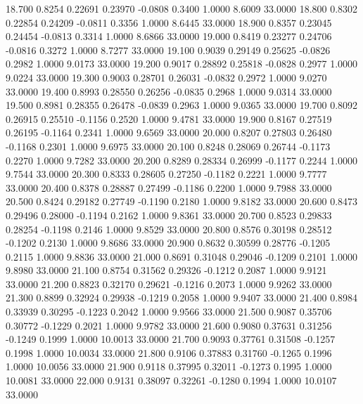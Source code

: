   18.700   0.8254   0.22691   0.23970  -0.0808   0.3400   1.0000   8.6009  33.0000
  18.800   0.8302   0.22854   0.24209  -0.0811   0.3356   1.0000   8.6445  33.0000
  18.900   0.8357   0.23045   0.24454  -0.0813   0.3314   1.0000   8.6866  33.0000
  19.000   0.8419   0.23277   0.24706  -0.0816   0.3272   1.0000   8.7277  33.0000
  19.100   0.9039   0.29149   0.25625  -0.0826   0.2982   1.0000   9.0173  33.0000
  19.200   0.9017   0.28892   0.25818  -0.0828   0.2977   1.0000   9.0224  33.0000
  19.300   0.9003   0.28701   0.26031  -0.0832   0.2972   1.0000   9.0270  33.0000
  19.400   0.8993   0.28550   0.26256  -0.0835   0.2968   1.0000   9.0314  33.0000
  19.500   0.8981   0.28355   0.26478  -0.0839   0.2963   1.0000   9.0365  33.0000
  19.700   0.8092   0.26915   0.25510  -0.1156   0.2520   1.0000   9.4781  33.0000
  19.900   0.8167   0.27519   0.26195  -0.1164   0.2341   1.0000   9.6569  33.0000
  20.000   0.8207   0.27803   0.26480  -0.1168   0.2301   1.0000   9.6975  33.0000
  20.100   0.8248   0.28069   0.26744  -0.1173   0.2270   1.0000   9.7282  33.0000
  20.200   0.8289   0.28334   0.26999  -0.1177   0.2244   1.0000   9.7544  33.0000
  20.300   0.8333   0.28605   0.27250  -0.1182   0.2221   1.0000   9.7777  33.0000
  20.400   0.8378   0.28887   0.27499  -0.1186   0.2200   1.0000   9.7988  33.0000
  20.500   0.8424   0.29182   0.27749  -0.1190   0.2180   1.0000   9.8182  33.0000
  20.600   0.8473   0.29496   0.28000  -0.1194   0.2162   1.0000   9.8361  33.0000
  20.700   0.8523   0.29833   0.28254  -0.1198   0.2146   1.0000   9.8529  33.0000
  20.800   0.8576   0.30198   0.28512  -0.1202   0.2130   1.0000   9.8686  33.0000
  20.900   0.8632   0.30599   0.28776  -0.1205   0.2115   1.0000   9.8836  33.0000
  21.000   0.8691   0.31048   0.29046  -0.1209   0.2101   1.0000   9.8980  33.0000
  21.100   0.8754   0.31562   0.29326  -0.1212   0.2087   1.0000   9.9121  33.0000
  21.200   0.8823   0.32170   0.29621  -0.1216   0.2073   1.0000   9.9262  33.0000
  21.300   0.8899   0.32924   0.29938  -0.1219   0.2058   1.0000   9.9407  33.0000
  21.400   0.8984   0.33939   0.30295  -0.1223   0.2042   1.0000   9.9566  33.0000
  21.500   0.9087   0.35706   0.30772  -0.1229   0.2021   1.0000   9.9782  33.0000
  21.600   0.9080   0.37631   0.31256  -0.1249   0.1999   1.0000  10.0013  33.0000
  21.700   0.9093   0.37761   0.31508  -0.1257   0.1998   1.0000  10.0034  33.0000
  21.800   0.9106   0.37883   0.31760  -0.1265   0.1996   1.0000  10.0056  33.0000
  21.900   0.9118   0.37995   0.32011  -0.1273   0.1995   1.0000  10.0081  33.0000
  22.000   0.9131   0.38097   0.32261  -0.1280   0.1994   1.0000  10.0107  33.0000
